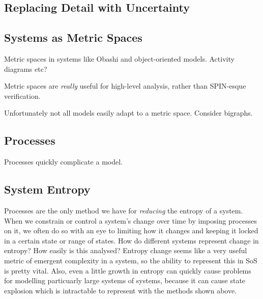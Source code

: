 \subsection{Replacing Detail with Uncertainty}


\subsection{Systems as Metric Spaces}
Metric spaces in systems like Obashi and object-oriented models. Activity diagrams etc?
\par

Metric spaces are \emph{really} useful for high-level analysis, rather than SPIN-esque verification.
\par

Unfortunately not all models easily adapt to a metric space. Consider bigraphs.
\par

\subsection{Processes}
Processes quickly complicate a model.


\subsection{System Entropy}
Processes are the only method we have for \emph{reducing} the entropy of a system.
When we constrain or control a system's change over time by imposing processes on it, we often do so with an eye to limiting how it changes and keeping it locked in a certain state or range of states.
How do different systems represent change in entropy? How easily is this analysed?
Entropy change seems like a very useful metric of emergent complexity in a system, so the ability to represent this in SoS is pretty vital.
Also, even a little growth in entropy can quickly cause problems for modelling particuarly large systems of systems, because it can cause state explosion which is intractable to represent with the methods shown above.  
\par

